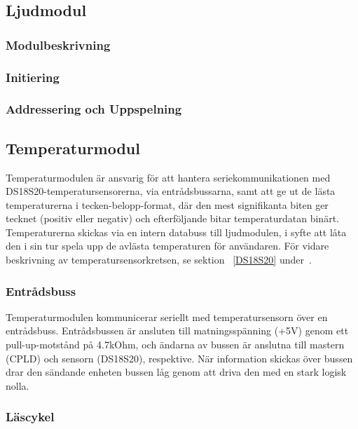 \documentclass[a4paper,11pt]{article}
\begin{document}
	\subsection{Ljudmodul}

		\subsubsection{Modulbeskrivning}

		\subsubsection{Initiering}

		\subsubsection{Addressering och Uppspelning}

	\subsection{Temperaturmodul}

	Temperaturmodulen är ansvarig för att hantera seriekommunikationen med 
	DS18S20-temperatursensorerna, via entrådsbussarna, samt att ge ut de lästa temperaturerna
	i tecken-belopp-format, där den mest signifikanta biten ger tecknet (positiv eller negativ) och efterföljande bitar temperaturdatan binärt.
	Temperaturerna skickas via en intern databuss till ljudmodulen, i syfte att låta den i sin tur spela upp de avlästa temperaturen för användaren. 
	För vidare beskrivning av temperatursensorkretsen, se sektion ~\ref{DS18S20} under~.

	\subsubsection{Entrådsbuss}

	Temperaturmodulen kommunicerar seriellt med temperatursensorn över en entrådsbuss.
	Entrådsbussen är ansluten till matningsspänning (+5V) genom ett pull-up-motstånd på 4.7kOhm, och
	ändarna av bussen är anslutna till mastern (CPLD) och sensorn (DS18S20), respektive. När information
	skickas över bussen drar den sändande enheten bussen låg genom att driva den
	med en stark logisk nolla.

	\subsubsection{Läscykel}
\end{document}
